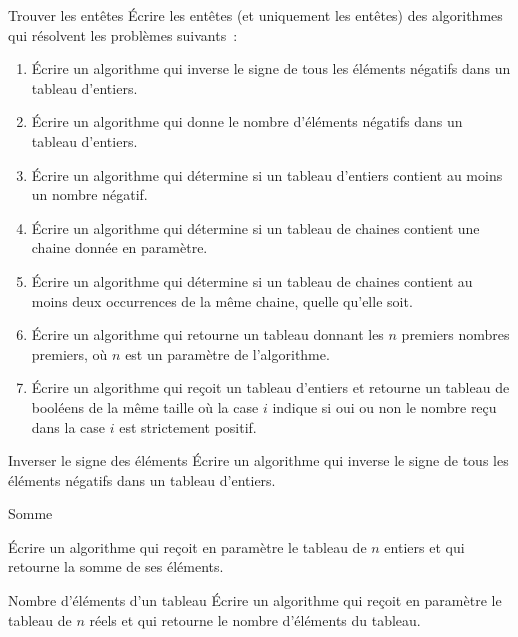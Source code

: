 	\begin{Exercice}{Trouver les entêtes}
		Écrire les entêtes (et uniquement les entêtes)
		des algorithmes qui résolvent les problèmes suivants~:
		\begin{enumerate}[label=\alph*)]
			\item
				Écrire un algorithme qui 
				inverse le signe de tous les éléments négatifs dans un tableau d’entiers.
			\item
				Écrire un algorithme qui
				donne le nombre d’éléments négatifs dans un tableau d’entiers.
			\item
				Écrire un algorithme qui
				détermine si un tableau d’entiers contient au moins un nombre négatif.
			\item
				Écrire un algorithme qui
				détermine si un tableau de chaines contient
				une chaine donnée en paramètre.
			\item
				Écrire un algorithme qui
				détermine si un tableau de chaines contient
				au moins deux occurrences de la même chaine,
				quelle qu’elle soit.
			\item
				Écrire un algorithme qui 
				retourne un tableau donnant les $n$ premiers nombres premiers,
				où $n$ est un paramètre de l’algorithme.
			\item
				Écrire un algorithme qui 
				reçoit un tableau d’entiers
				et retourne un tableau de booléens de la même taille
				où la case $i$ indique si oui ou non
				le nombre reçu dans la case $i$ est strictement positif.
		\end{enumerate}
	\end{Exercice}


	\begin{Exercice}{Inverser le signe des éléments}
		Écrire un algorithme qui 
		inverse le signe de tous les éléments négatifs dans un tableau d’entiers.
	\end{Exercice}

	\begin{Exercice}{Somme}

		Écrire un algorithme qui reçoit en paramètre le tableau
		 de $n$ entiers 
		et qui retourne la somme de ses éléments.
	\end{Exercice}

	\begin{Exercice}{Nombre d’éléments d’un tableau}
		Écrire un algorithme qui reçoit en paramètre le tableau
		 de $n$ réels et qui
		retourne le nombre d’éléments du tableau.
	\end{Exercice}

